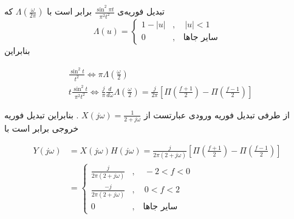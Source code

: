 \documentclass{article}
\newcommand{\qn}[1]{
\[
\begin{split}
#1
\end{split}
\]
}
\begin{document}
%

\large

تبدیل فوریه‌ی 
$
\frac{\sin^2 \pi t}{\pi^2t^2}
$
برابر است با
$
\Lambda (\frac{\omega}{2\pi})
$
که
$$
\Lambda (u)=\begin{cases}
1-|u|&,\quad |u|<1\\
0&,\quad \text{سایر جاها}
\end{cases}
$$
بنابراین
\qn{
&\frac{\sin^2 t}{t^2}\iff \pi\Lambda (\frac{\omega}{2})
\\&
t\frac{\sin^2 t}{\pi^2t^2}\iff \frac{j}{\pi}\frac{d}{d\omega}\Lambda (\frac{\omega}{2})
=
\frac{j}{2\pi}\left[\Pi(\frac{f+1}{2})-\Pi(\frac{f-1}{2})\right]
}
از طرفی تبدیل فوریه ورودی عبارتست از
$
X(j\omega)=\frac{1}{2+j\omega}
$
. بنابراین تبدیل فوریه خروجی برابر است با
\qn{
Y(j\omega)&=X(j\omega)H(j\omega)=
\frac{j}{2\pi(2+j\omega)}\left[\Pi(\frac{f+1}{2})-\Pi(\frac{f-1}{2})\right]
\\&=
\begin{cases}
\frac{j}{2\pi(2+j\omega)}&,\quad -2<f<0\\
\frac{-j}{2\pi(2+j\omega)}&,\quad 0<f<2\\
0&,\quad \text{سایر جاها}
\end{cases}
}
\end{document}
